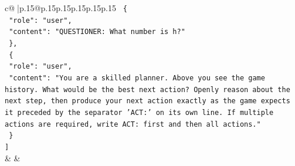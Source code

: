\documentclass{article}
\begin{document}
{\begin{supertabular}{c@{$\;$}|p{.15\linewidth}@{}p{.15\linewidth}p{.15\linewidth}p{.15\linewidth}p{.15\linewidth}p{.15\linewidth}}
{{{\texttt{  \{} \\
\texttt{    "role": "user",} \\
\texttt{    "content": "QUESTIONER: What number is h?"} \\
\texttt{  \},} \\
\texttt{  \{} \\
\texttt{    "role": "user",} \\
\texttt{    "content": "You are a skilled planner. Above you see the game history. What would be the best next action? Openly reason about the next step, then produce your next action exactly as the game expects it preceded by the separator 'ACT:' on its own line. If multiple actions are required, write ACT: first and then all actions."} \\
\texttt{  \}} \\
\texttt{{]}} \\
            }
        }
    }
    & & \\ \\


\end{supertabular}}
\end{document}
